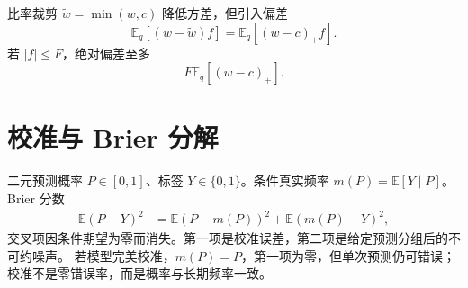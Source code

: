 \documentclass[11pt]{article}
\numberwithin{equation}{section}
\newcommand{\E}{\mathbb{E}}
\newcommand{\1}{\mathbf{1}}
\begin{document}
比率裁剪 $\widetilde w=\min(w,c)$ 降低方差，但引入偏差
\begin{equation}
 \E_q[(w-\widetilde w)f]
 =\E_q[(w-c)_+f].
\end{equation}
若 $|f|\le F$，绝对偏差至多
\begin{equation}
 F\E_q[(w-c)_+].
\end{equation}

\section{校准与 Brier 分解}

二元预测概率 $P\in[0,1]$、标签 $Y\in\{0,1\}$。条件真实频率
$m(P)=\E[Y\mid P]$。Brier 分数
\begin{align}
 \E(P-Y)^2
 &=\E(P-m(P))^2+\E(m(P)-Y)^2,
\end{align}
交叉项因条件期望为零而消失。第一项是校准误差，第二项是给定预测分组后的不可约噪声。
若模型完美校准，$m(P)=P$，第一项为零，但单次预测仍可错误；
校准不是零错误率，而是概率与长期频率一致。
\end{document}
